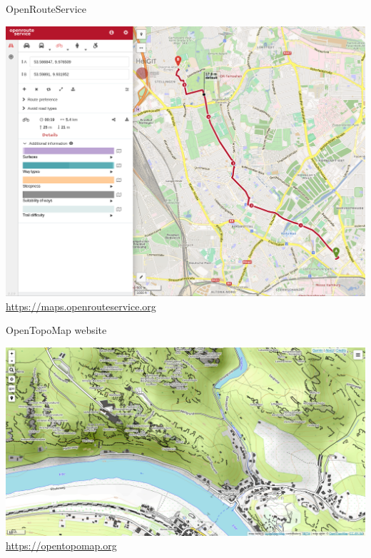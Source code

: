 \documentclass{beamer}
\begin{document}
	\begin{frame}{OpenRouteService}
		\begin{center}
			\includegraphics[height=0.7\textheight]{images/openrouteservice}\\
			\url{https://maps.openrouteservice.org}
		\end{center}
	\end{frame}

	\begin{frame}{OpenTopoMap website}
		\begin{center}
			\includegraphics[height=0.7\textheight]{images/opentopomap-website}\\
			\url{https://opentopomap.org}
		\end{center}
	\end{frame}
\end{document}
